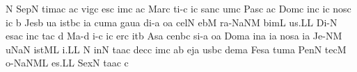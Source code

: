 \spatium
\divisiofinalis
\spatium
\custos N
\lineaproxima
\sgn Sep\punctum N\egn
\sgn tim\pes ac\egn
\sgn {}a{}\punctum c\egn
\spatium
\sgn vig\punctum c\egn
\sgn {}es\punctum c\egn
\sgn {}im\punctum c\egn
\sgn {}a{}\punctum c\egn
\spatium
\sgn Mar\punctum c\egn
\sgn ti-\punctum c\egn
\sgn {}i{}\punctum c\egn
\spatium
\sgn san\punctum c\egn
{}um\punctum c\egn
\spatium
\sgn Pas\punctum c\egn
{}a{}\punctum c\egn
\spatium
\sgn Dom\punctum c\egn
\sgn {}in\punctum c\egn
\sgn {}i{}\punctum c\egn
\spatium
\sgn nos\punctum c\egn
{}i{}\punctum c\egn
\spatium
\custos b
\lineaproxima
\sgn Jes\punctum b\egn
\sgn {}u{}\punctum a\egn
\spatium
{}i{st}\pes bc\egn
\sgn {}i{}\punctum a\egn
\spatium
\sgn cum\punctum a\egn
\spatium
\sgn gau\punctum a\egn
\sgn di-\punctum a\egn
\sgn {}o{}\punctum a\egn
\spatium
\sgn cel\punctum N\egn
\sgn {}eb\punctum M\egn
\sgn ra-\pessubbipunctis NaNM\egn
\sgn bim\punctum L\egn
\sgn {}u{s.}\punctum L\augmentum L\egn
\spatium
\divisiofinalis
\spatium
\sgn Di-\punctum N\egn
\sgn {}es\pes ac\egn
\spatium
{}in\punctum c\egn
\sgn ta{}\punctum c\egn
\spatium
\custos d
\lineaproxima
\sgn Ma-\punctum d\egn
\sgn {}i{-}\punctum c\egn
\sgn {}i{}\punctum c\egn
\spatium
\sgn {}er\punctum c\egn
\sgn {}it\punctum b\egn
\spatium
\sgn {}As\punctum a\egn
\sgn cen\pes bc\egn
\sgn si-\punctum a\egn
\sgn {}o{}\punctum a\egn
\spatium
\sgn Dom\punctum a\egn
\sgn {}in\punctum a\egn
\sgn {}i{}\punctum a\egn
\spatium
\sgn nos\punctum a\egn
{}i{}\punctum a\egn
\spatium
\sgn Je-\clivis NM\egn
{}u{}\torculus NaN\egn
\spatium
{}i{st}\clivis ML\egn
\sgn {}i.\punctum L\augmentum L\egn
\spatium
\divisiofinalis
\spatium
\custos N
\lineaproxima
{}in\punctum N\egn
\sgn ta{}\pes ac\egn
\spatium
\sgn dec\punctum c\egn
\sgn {}im\punctum c\egn
\sgn {}a{}\punctum b\egn
\spatium
\sgn {}ej\punctum a\egn
\sgn {}us\pes bc\egn
\sgn dem\punctum a\egn
\spatium
\sgn Fes\punctum a\egn
\sgn tum\punctum a\egn
\spatium
\sgn Pen\punctum N\egn
\sgn tec\punctum M\egn
\sgn {}o-\pessubbipunctis NaNM\nonspatium\punctuminclinatum L\egn
{}e{s.}\punctum L\augmentum L\egn
\spatium
\divisiofinalis
\spatium
\sgn Sex\punctum N\egn
\sgn ta{}\pes ac\egn
\spatium
\custos c
\lineaproxima
